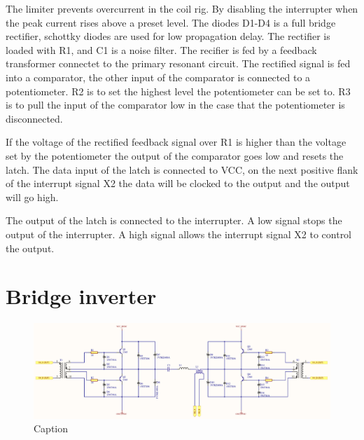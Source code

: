 The limiter prevents overcurrent in the coil rig. By disabling the interrupter when the peak current rises above a preset level. The diodes D1-D4 is a full bridge rectifier, schottky diodes are used for low propagation delay. The rectifier is loaded with R1, and C1 is a noise filter. The recifier is fed by a feedback transformer connectet to the primary resonant circuit. The rectified signal is fed into a comparator, the other input of the comparator is connected to a potentiometer. R2 is to set the highest level the potentiometer can be set to. R3 is to pull the input of the comparator low in the case that the potentiometer is disconnected.

If the voltage of the rectified feedback signal over R1 is higher than the voltage set by the potentiometer the output of the comparator goes low and resets the latch. The data input of the latch is connected to VCC, on the next positive flank of the interrupt signal X2 the data will be clocked to the output and the output will go high.

The output of the latch is connected to the interrupter. A low signal stops the output of the interrupter. A high signal allows the interrupt signal X2 to control the output.



\newpage
\section{Bridge inverter}

\begin{figure}[h!]
    \centering
    \includegraphics[width=\textwidth]{Skjema/TK531_Utgangstrinn.pdf}
    \caption{Caption}
    \label{fig:tk531}
\end{figure}

